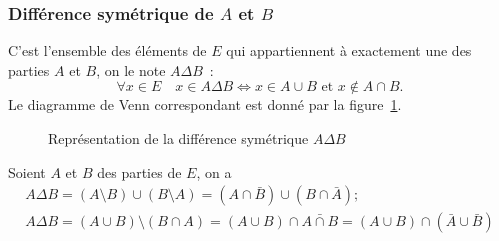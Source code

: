 \subsubsection{Différence symétrique de \(A\) et \(B\)}
\label{chap3-subsubsec:differencesymetrique}
C'est l'ensemble des éléments de \(E\) qui appartiennent à exactement une des parties \(A\) et \(B\), on le note $A \Delta
B$~:
\begin{equation}
  \forall x \in E \quad x \in A \Delta B \iff x \in A \cup B \text{~et~} x \not\in A \cap B.
\end{equation}
Le diagramme de Venn correspondant est donné par la figure~\ref{chap3-fig:diffsym}.

\begin{figure}
\centering
{}
\caption{Représentation de la différence symétrique \(A \Delta B\)}
\label{chap3-fig:diffsym}
\end{figure}

\begin{prop}
  Soient \(A\) et \(B\) des parties de \(E\), on a 
  \begin{gather}
    A \Delta B = (A\setminus B) \cup (B \setminus A) = (A \cap \bar{B}) \cup (B \cap \bar{A}); \\
    A \Delta B =(A \cup B) \setminus (B \cap A) = (A \cup B) \cap \bar{A \cap B} =(A \cup B) \cap (\bar{A} \cup \bar{B})
  \end{gather}
\end{prop}

